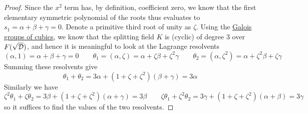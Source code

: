 \begin{proof}
    Since the \(x^2\) term has, by definition, coefficient zero,
    we know that the first elementary symmetric polynomial of the roots thus evaluates to
    \(s_1 = \alpha + \beta + \gamma = 0\).
    Denote a primitive third root of unity as \(\zeta\).
    Using the \hyperref[thm:galois-group-cubic]{Galois groups of cubics},
    we know that the splitting field \(K\) is (cyclic) of degree 3 over \(F(\sqrt{\mathcal{D}})\),
    and hence it is meaningful to look at the Lagrange resolvents
    \begin{equation*}
        (\alpha,1) = \alpha + \beta + \gamma = 0 \qquad
        \theta_1 = (\alpha,\zeta) = \alpha + \zeta\beta + \zeta^2\gamma \qquad
        \theta_2 = (\alpha,\zeta^2) = \alpha + \zeta^2\beta + \zeta\gamma
    \end{equation*}
    Summing these resolvents give
    \[\theta_1 + \theta_2 = 3\alpha + (1+\zeta+\zeta^2)(\beta + \gamma) = 3\alpha\]
    Similarly we have
    \begin{equation*}
        \zeta^2\theta_1 + \zeta\theta_2 = 3\beta + (1+\zeta+\zeta^2)(\alpha + \gamma) = 3\beta \qquad
        \zeta\theta_1 + \zeta^2\theta_2 = 3\gamma + (1+\zeta+\zeta^2)(\alpha + \beta) = 3\gamma
    \end{equation*}
    so it suffices to find the values of the two resolvents.


\end{proof}
